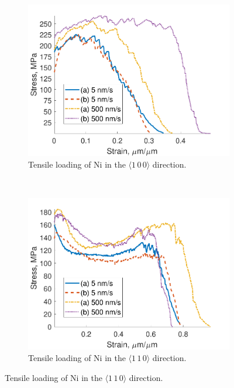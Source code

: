 \begin{figure}
    \centering
    \begin{subfigure}[t]{0.45\linewidth}
        \centering
        \includegraphics[width=\linewidth]{../data/Ni100.pdf}
        \caption[Tensile loading of Ni in the $\langle 1\, 0\, 0 \rangle$ direction.]{Tensile loading of Ni in the $\langle 1\, 0\, 0 \rangle$ direction.}
        \label{sc:Ni100}
    \end{subfigure}
    ~
    \begin{subfigure}[t]{0.45\linewidth}
        \centering
        \includegraphics[width=\linewidth]{../data/Ni110.pdf}
        \caption[Tensile loading of Ni in the $\langle 1\, 1\, 0 \rangle$ direction.]{Tensile loading of Ni in the $\langle 1\, 1\, 0 \rangle$ direction.}
        \label{sc:Ni110}
    \end{subfigure}


\end{figure}
